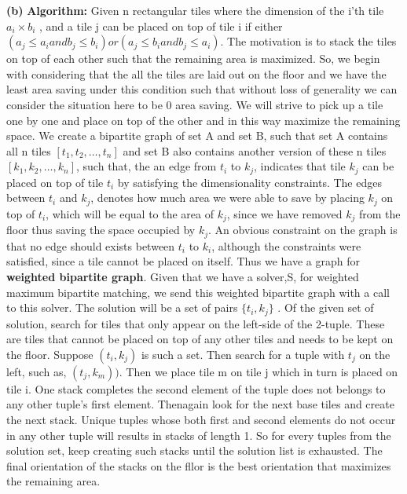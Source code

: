 \documentclass{article}
\renewcommand\part[1]{\vspace{.10in}\textbf{(#1)}}
\newcommand\algo{\vspace{.10in}\textbf{Algorithm: }}
\begin{document}
  \part{b}
  \algo Given n rectangular tiles where the dimension of the i'th tile $a_{i} \times b_{i}$ , and a tile j can be placed on top of tile i if either $(a_j \leq a_i and b_j \leq b_i) or (a_j \leq b_i and b_j \leq a_i)$. The motivation is to stack the tiles on top of each other such that the remaining area is maximized. So, we begin with considering that the all the tiles are laid out on the floor and we have the least area saving under this condition such that without loss of generality we can consider the situation here to be 0 area saving. We will strive to pick up a tile one by one and place on top of the other and in this way maximize the remaining space. \newline
  We create a bipartite graph of set A and set B, such that set A contains all n tiles $[t_1, t_2, \dots , t_n]$ and set B also contains another version of these n tiles $[k_1, k_2, \dots, k_n]$, such that, the an edge from $t_i$ to $k_j$, indicates that tile $k_j$ can be placed on top of tile $t_i$ by satisfying the dimensionality constraints. The edges between $t_i$ and $k_j$, denotes how much area we were able to save by placing $k_j$ on top of $t_i$, which will be equal to the area of $k_j$, since we have removed $k_j$ from the floor thus saving the space occupied by $k_j$. An obvious constraint on the graph is that no edge should exists between $t_i$ to $k_i$, although the constraints were satisfied, since a tile cannot be placed on itself. Thus we have a graph for \textbf {weighted bipartite graph}. Given that we have a solver,S, for weighted maximum bipartite matching, we send this weighted bipartite graph with a call to this solver. The solution will be a set of pairs $\{ t_i,k_j\}$ . Of the given set of solution, search for tiles that only appear on the left-side of the 2-tuple. These are tiles that cannot be placed on top of any other tiles and needs to be kept on the floor. Suppose $(t_i,k_j)$ is such a set. Then search for a tuple with $t_j$ on the left, such as, $(t_j, k_m))$. Then we place tile m on tile j which in turn is placed on tile i. One stack completes the second element of the tuple does not belongs to any other tuple's first element. Thenagain look for the next base tiles and create the next stack. Unique tuples whose both first and second elements do not occur in any other tuple will results in stacks of length 1. So for every tuples from the solution set, keep creating such stacks until the solution list is exhausted. The final orientation of the stacks on the fllor is the best orientation that maximizes the remaining area. \newline
\end{document}
